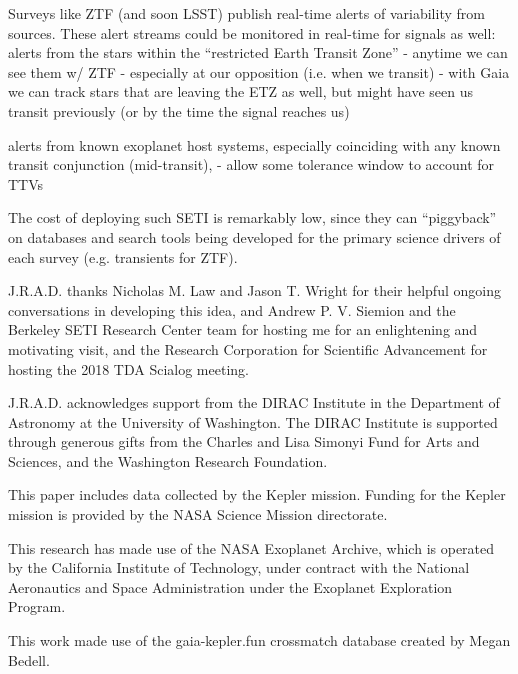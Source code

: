 \documentclass[twocolumn]{aastex62}
\begin{document}
Surveys like ZTF (and soon LSST) publish real-time alerts of variability from sources. These alert streams could be monitored in real-time for signals as well:
alerts from the stars within the ``restricted Earth Transit Zone'' \citep{heller2016}
	- anytime we can see them w/ ZTF
	- especially at our opposition (i.e. when we transit)
	- with Gaia we can track stars that are leaving the ETZ as well, but might 
	have seen us transit previously (or by the time the signal reaches us)

alerts from known exoplanet host systems, especially coinciding with any known transit conjunction (mid-transit), 
	- allow some tolerance window to account for TTVs



The cost of deploying such SETI is remarkably low, since they can ``piggyback'' on databases and search tools being developed for the primary science drivers of each survey (e.g. transients for ZTF).




\acknowledgments

J.R.A.D. thanks Nicholas M. Law and Jason T. Wright for their helpful ongoing conversations in developing this idea, and Andrew P. V. Siemion and the Berkeley SETI Research Center team for hosting me for an enlightening and motivating visit, and the Research Corporation for Scientific Advancement for hosting the 2018 TDA Scialog meeting.

J.R.A.D. acknowledges support from the DIRAC Institute in the Department of Astronomy at the University of Washington. The DIRAC Institute is supported through generous gifts from the Charles and Lisa Simonyi Fund for Arts and Sciences, and the Washington Research Foundation.

This paper includes data collected by the Kepler mission. Funding for the Kepler mission is provided by the NASA Science Mission directorate.

This research has made use of the NASA Exoplanet Archive, which is operated by the California Institute of Technology, under contract with the National Aeronautics and Space Administration under the Exoplanet Exploration Program.

This work made use of the gaia-kepler.fun crossmatch database created by Megan Bedell.


\end{document}
